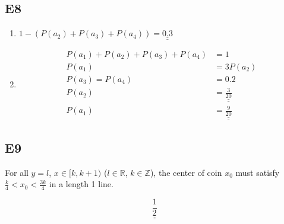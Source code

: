 \documentclass[12pt, a4paper]{article}
\begin{document}
\subsection* {E8}
\begin{enumerate}
  \item $1 - \left( P(a_2) + P(a_3) + P(a_4) \right) = \underline{\underline{ 0.3 }} $
  \item
	\begin{align*}
	P(a_1) + P(a_2) + P(a_3) + P(a_4) &= 1 \\
	P(a_1) &= 3P(a_2) \\
	P(a_3) = P(a_4) &= 0.2 \\
	P(a_2) &= \underline{\underline{\frac{3}{20}}} \\
	P(a_1) &= \underline{\underline{\frac{9}{20}}}
	\end{align*}
\end{enumerate}


\subsection* {E9}
For all $y = l$, $x \in [k, k + 1)$ ($l \in \mathbb{R}$, $k \in \mathbb{Z}$), the center of coin $x_0$ must satisfy $\frac{k}{4} < x_0 < \frac{3k}{4}$ in a length 1 line.

$$\underline{\underline{\frac{1}{2}}}$$


\end{document}
